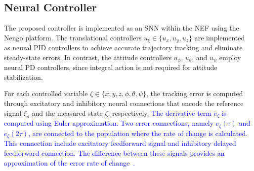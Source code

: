\documentclass[conference]{IEEEtran}
\begin{document}
%





\subsection{Neural Controller}\label{Control_SNN}



The proposed controller is implemented as an SNN within the NEF using the Nengo platform. The translational controllers $u_\xi\in\{u_x,u_y,u_z\}$ are implemented as neural PID controllers to achieve accurate trajectory tracking and eliminate steady-state errors. In contrast, the attitude controllers $u_\phi$, $u_\theta$, and $u_\psi$ employ neural PD controllers, since integral action is not required for attitude stabilization.

For each controlled variable $\zeta\in\{x,y,z,\phi,\theta,\psi\}$, the tracking error is computed through excitatory and inhibitory neural connections that encode the reference signal $\zeta_d$ and the measured state $\zeta$, respectively. \textcolor{blue}{The derivative term $\dot{e}_\zeta$ is computed using Euler approximation. Two error connections, namely $e_\zeta(\tau)$ and $e_\zeta(2\tau)$, are connected to the population where the rate of change is calculated. This connection include excitatory feedforward signal and inhibitory delayed feedforward connection.  The difference between these signals provides an approximation of the error rate of change~\cite{Olivares2025}.} %
\end{document}
